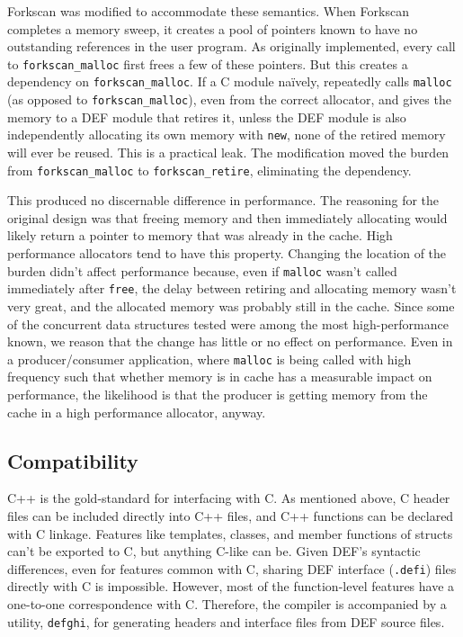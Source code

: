 Forkscan was modified to accommodate these semantics.  When Forkscan completes a memory sweep, it creates a pool of pointers known to have no outstanding references in the user program.  As originally implemented, every call to \texttt{forkscan\_{}malloc} first frees a few of these pointers.  But this creates a dependency on \texttt{forkscan\_{}malloc}.  If a C module na\"ively, repeatedly calls \texttt{malloc} (as opposed to \texttt{forkscan\_{}malloc}), even from the correct allocator, and gives the memory to a DEF module that retires it, unless the DEF module is also independently allocating its own memory with \texttt{new}, none of the retired memory will ever be reused.  This is a practical leak.  The modification moved the burden from \texttt{forkscan\_{}malloc} to \texttt{forkscan\_retire}, eliminating the dependency.

This produced no discernable difference in performance.  The reasoning for the original design was that freeing memory and then immediately allocating would likely return a pointer to memory that was already in the cache.  High performance allocators tend to have this property.  Changing the location of the burden didn't affect performance because, even if \texttt{malloc} wasn't called immediately after \texttt{free}, the delay between retiring and allocating memory wasn't very great, and the allocated memory was probably still in the cache.  Since some of the concurrent data structures tested were among the most high-performance known, we reason that the change has little or no effect on performance.  Even in a producer/consumer application, where \texttt{malloc} is being called with high frequency such that whether memory is in cache has a measurable impact on performance, the likelihood is that the producer is getting memory from the cache in a high performance allocator, anyway.

\subsection{Compatibility}

C++ is the gold-standard for interfacing with C.  As mentioned above, C header files can be included directly into C++ files, and C++ functions can be declared with C linkage.  Features like templates, classes, and member functions of structs can't be exported to C, but anything C-like can be.  Given DEF's syntactic differences, even for features common with C, sharing DEF interface (\texttt{.defi}) files directly with C is impossible.  However, most of the function-level features have a one-to-one correspondence with C.  Therefore, the compiler is accompanied by a utility, \texttt{defghi}, for generating headers and interface files from DEF source files.

